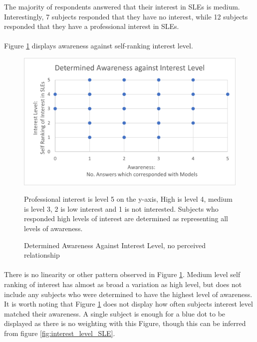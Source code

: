 The majority of respondents answered that their interest in SLEs is medium. Interestingly, 7 subjects responded that they have no interest, while 12 subjects responded that they have a professional interest in SLEs. 
\paragraph{}
Figure \ref{fig:aware_vs_interest} displays awareness against self-ranking interest level.

\begin{figure}[H]
    \centering
    \includegraphics{fig_results/aware_vs_interest.png}
    \caption{Determined Awareness Against Interest Level, no perceived relationship}{ Professional interest is level 5 on the y-axis, High  is level 4, medium is level 3, 2 is low interest and 1 is not interested. Subjects who responded high levels of interest are determined as representing all levels of awareness.}
    \label{fig:aware_vs_interest}
\end{figure}
\paragraph{}

There is no linearity or other pattern observed in Figure \ref{fig:aware_vs_interest}. Medium level self ranking of interest has almost as broad a variation as high level, but does not include any subjects who were determined to have the highest level of awareness.  It is worth noting  that Figure \ref{fig:aware_vs_interest} does not display how often subjects interest level matched their awareness. A single subject is enough for a blue dot to be displayed as there is no weighting with this Figure, though this can be inferred from figure \ref{fig:interest_level_SLE}. 


